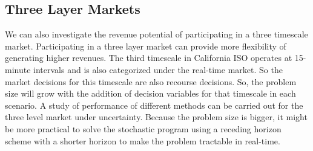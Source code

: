 \documentclass[11pt,twoside]{article}
\begin{document}
\subsection{Three Layer Markets}
We can also investigate the revenue potential of participating in a three timescale market. Participating in a three layer market can provide more flexibility of generating higher revenues. The third timescale in California ISO operates at 15-minute intervals and is also categorized under the real-time market. So the market decisions for this timescale are also recourse decisions. So, the problem size will grow with the addition of decision variables for that timescale in each scenario. A study of performance of different methods can be carried out for the three level market under uncertainty. Because the problem size is bigger, it might be more practical to solve the stochastic program using a receding horizon scheme with a shorter horizon to make the problem tractable in real-time.



\end{document}
